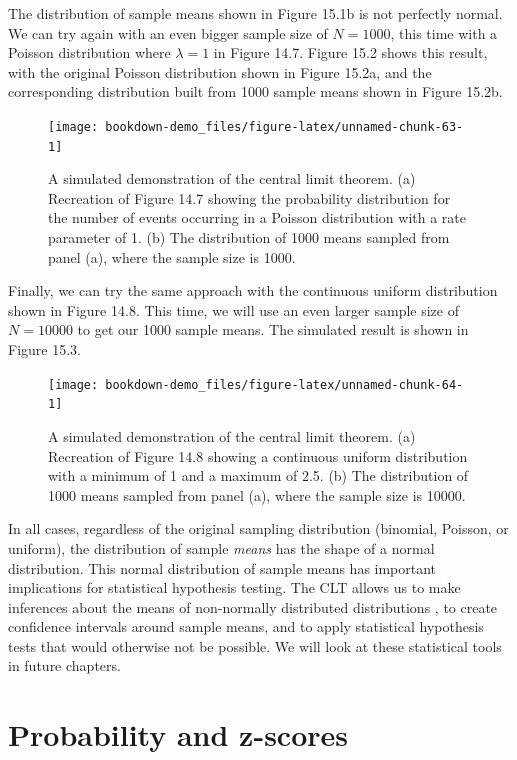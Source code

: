 \documentclass[
]{scrbook}
\begin{document}
The distribution of sample means shown in Figure 15.1b is not perfectly normal.
We can try again with an even bigger sample size of \(N = 1000\), this time with a Poisson distribution where \(\lambda = 1\) in Figure 14.7.
Figure 15.2 shows this result, with the original Poisson distribution shown in Figure 15.2a, and the corresponding distribution built from 1000 sample means shown in Figure 15.2b.

\begin{figure}
\texttt{[image: bookdown-demo\_files/figure-latex/unnamed-chunk-63-1]} \caption{A simulated demonstration of the central limit theorem. (a) Recreation of Figure 14.7 showing the probability distribution for the number of events occurring in a Poisson distribution with a rate parameter of 1. (b) The distribution of 1000 means sampled from panel (a), where the sample size is 1000.}\label{fig:unnamed-chunk-63}
\end{figure}

Finally, we can try the same approach with the continuous uniform distribution shown in Figure 14.8.
This time, we will use an even larger sample size of \(N = 10000\) to get our 1000 sample means.
The simulated result is shown in Figure 15.3.

\begin{figure}
\texttt{[image: bookdown-demo\_files/figure-latex/unnamed-chunk-64-1]} \caption{A simulated demonstration of the central limit theorem. (a) Recreation of Figure 14.8 showing a continuous uniform distribution with a minimum of 1 and a maximum of 2.5. (b) The distribution of 1000 means sampled from panel (a), where the sample size is 10000.}\label{fig:unnamed-chunk-64}
\end{figure}

In all cases, regardless of the original sampling distribution (binomial, Poisson, or uniform), the distribution of sample \emph{means} has the shape of a normal distribution.
This normal distribution of sample means has important implications for statistical hypothesis testing.
The CLT allows us to make inferences about the means of non-normally distributed distributions \citep{Sokal1995}, to create confidence intervals around sample means, and to apply statistical hypothesis tests that would otherwise not be possible.
We will look at these statistical tools in future chapters.

\hypertarget{probability-and-z-scores}{%
\section{Probability and z-scores}\label{probability-and-z-scores}}
\end{document}
